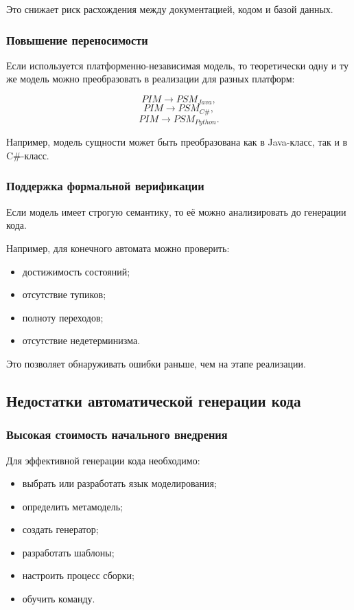 \documentclass[12pt,a4paper]{article}
\begin{document}
Это снижает риск расхождения между документацией, кодом и базой данных.

\subsubsection{Повышение переносимости}

Если используется платформенно-независимая модель, то теоретически одну и ту же модель можно преобразовать в реализации для разных платформ:

\[
    PIM \longrightarrow PSM_{Java},
\]
\[
    PIM \longrightarrow PSM_{C\#},
\]
\[
    PIM \longrightarrow PSM_{Python}.
\]

Например, модель сущности может быть преобразована как в Java-класс, так и в C\#-класс.

\subsubsection{Поддержка формальной верификации}

Если модель имеет строгую семантику, то её можно анализировать до генерации кода.

Например, для конечного автомата можно проверить:

\begin{itemize}
    \item достижимость состояний;
    \item отсутствие тупиков;
    \item полноту переходов;
    \item отсутствие недетерминизма.
\end{itemize}

Это позволяет обнаруживать ошибки раньше, чем на этапе реализации.

\subsection{Недостатки автоматической генерации кода}

\subsubsection{Высокая стоимость начального внедрения}

Для эффективной генерации кода необходимо:

\begin{itemize}
    \item выбрать или разработать язык моделирования;
    \item определить метамодель;
    \item создать генератор;
    \item разработать шаблоны;
    \item настроить процесс сборки;
    \item обучить команду.
\end{itemize}
\end{document}
